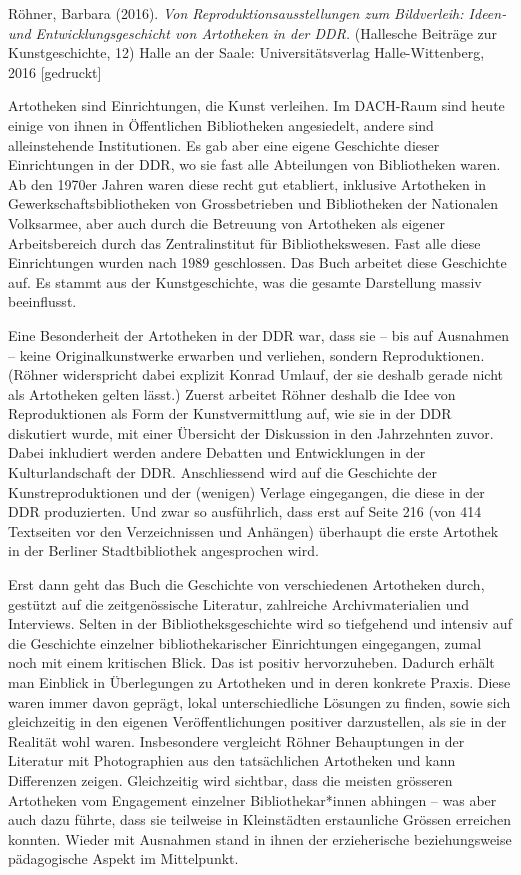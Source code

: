 \documentclass[a4paper,
fontsize=11pt,
oneside,
numbers=noperiodatend,
parskip=half-,
bibliography=totoc,
final
]{scrartcl}
\begin{document}
Röhner, Barbara (2016). \emph{Von Reproduktionsausstellungen zum
Bildverleih: Ideen- und Entwicklungsgeschicht von Artotheken in der
DDR.} (Hallesche Beiträge zur Kunstgeschichte, 12) Halle an der Saale:
Universitätsverlag Halle-Wittenberg, 2016 {[}gedruckt{]}

Artotheken sind Einrichtungen, die Kunst verleihen. Im DACH-Raum sind
heute einige von ihnen in Öffentlichen Bibliotheken angesiedelt, andere
sind alleinstehende Institutionen. Es gab aber eine eigene Geschichte
dieser Einrichtungen in der DDR, wo sie fast alle Abteilungen von
Bibliotheken waren. Ab den 1970er Jahren waren diese recht gut
etabliert, inklusive Artotheken in Gewerkschaftsbibliotheken von
Grossbetrieben und Bibliotheken der Nationalen Volksarmee, aber auch
durch die Betreuung von Artotheken als eigener Arbeitsbereich durch das
Zentralinstitut für Bibliothekswesen. Fast alle diese Einrichtungen
wurden nach 1989 geschlossen. Das Buch arbeitet diese Geschichte auf. Es
stammt aus der Kunstgeschichte, was die gesamte Darstellung massiv
beeinflusst.

Eine Besonderheit der Artotheken in der DDR war, dass sie -- bis auf
Ausnahmen -- keine Originalkunstwerke erwarben und verliehen, sondern
Reproduktionen. (Röhner widerspricht dabei explizit Konrad Umlauf, der
sie deshalb gerade nicht als Artotheken gelten lässt.) Zuerst arbeitet
Röhner deshalb die Idee von Reproduktionen als Form der Kunstvermittlung
auf, wie sie in der DDR diskutiert wurde, mit einer Übersicht der
Diskussion in den Jahrzehnten zuvor. Dabei inkludiert werden andere
Debatten und Entwicklungen in der Kulturlandschaft der DDR.
Anschliessend wird auf die Geschichte der Kunstreproduktionen und der
(wenigen) Verlage eingegangen, die diese in der DDR produzierten. Und
zwar so ausführlich, dass erst auf Seite 216 (von 414 Textseiten vor den
Verzeichnissen und Anhängen) überhaupt die erste Artothek in der
Berliner Stadtbibliothek angesprochen wird.

Erst dann geht das Buch die Geschichte von verschiedenen Artotheken
durch, gestützt auf die zeitgenössische Literatur, zahlreiche
Archivmaterialien und Interviews. Selten in der Bibliotheksgeschichte
wird so tiefgehend und intensiv auf die Geschichte einzelner
bibliothekarischer Einrichtungen eingegangen, zumal noch mit einem
kritischen Blick. Das ist positiv hervorzuheben. Dadurch erhält man
Einblick in Überlegungen zu Artotheken und in deren konkrete Praxis.
Diese waren immer davon geprägt, lokal unterschiedliche Lösungen zu
finden, sowie sich gleichzeitig in den eigenen Veröffentlichungen
positiver darzustellen, als sie in der Realität wohl waren. Insbesondere
vergleicht Röhner Behauptungen in der Literatur mit Photographien aus
den tatsächlichen Artotheken und kann Differenzen zeigen. Gleichzeitig
wird sichtbar, dass die meisten grösseren Artotheken vom Engagement
einzelner Bibliothekar*innen abhingen -- was aber auch dazu führte, dass
sie teilweise in Kleinstädten erstaunliche Grössen erreichen konnten.
Wieder mit Ausnahmen stand in ihnen der erzieherische beziehungsweise
pädagogische Aspekt im Mittelpunkt.
\end{document}

